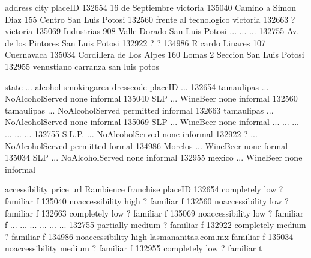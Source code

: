 \documentclass[letterpaper,10pt,english]{jupyterBook}
\begin{document}
\begin{sphinxVerbatim}[commandchars=\\\{\}]
                                             address             city  \PYGZbs{}
placeID                                                                 
132654                              16 de Septiembre        victoria    
135040                Camino a Simon Diaz 155 Centro  San Luis Potosi   
132560                         frente al tecnologico         victoria   
132663                                             ?         victoria   
135069                   Industrias 908 Valle Dorado  San Luis Potosi   
...                                              ...              ...   
132755                           Av. de los Pintores  San Luis Potosi   
132922                                             ?                ?   
134986                           Ricardo Linares 107       Cuernavaca   
135034   Cordillera de Los Alpes 160 Lomas 2 Seccion  San Luis Potosi   
132955                           venustiano carranza   san luis potos   

              state  ...            alcohol smoking\PYGZus{}area dress\PYGZus{}code  \PYGZbs{}
placeID              ...                                              
132654   tamaulipas  ...  No\PYGZus{}Alcohol\PYGZus{}Served         none   informal   
135040          SLP  ...          Wine\PYGZhy{}Beer         none   informal   
132560   tamaulipas  ...  No\PYGZus{}Alcohol\PYGZus{}Served    permitted   informal   
132663   tamaulipas  ...  No\PYGZus{}Alcohol\PYGZus{}Served         none   informal   
135069          SLP  ...          Wine\PYGZhy{}Beer         none   informal   
...             ...  ...                ...          ...        ...   
132755       S.L.P.  ...  No\PYGZus{}Alcohol\PYGZus{}Served         none   informal   
132922            ?  ...  No\PYGZus{}Alcohol\PYGZus{}Served    permitted     formal   
134986      Morelos  ...          Wine\PYGZhy{}Beer         none     formal   
135034          SLP  ...  No\PYGZus{}Alcohol\PYGZus{}Served         none   informal   
132955       mexico  ...          Wine\PYGZhy{}Beer         none   informal   

            accessibility   price                  url Rambience franchise  \PYGZbs{}
placeID                                                                      
132654         completely     low                    ?  familiar         f   
135040   no\PYGZus{}accessibility    high                    ?  familiar         f   
132560   no\PYGZus{}accessibility     low                    ?  familiar         f   
132663         completely     low                    ?  familiar         f   
135069   no\PYGZus{}accessibility     low                    ?  familiar         f   
...                   ...     ...                  ...       ...       ...   
132755          partially  medium                    ?  familiar         f   
132922         completely  medium                    ?  familiar         f   
134986   no\PYGZus{}accessibility    high  lasmananitas.com.mx  familiar         f   
135034   no\PYGZus{}accessibility  medium                    ?  familiar         f   
132955         completely     low                    ?  familiar         t   


\end{sphinxVerbatim}
\end{document}
